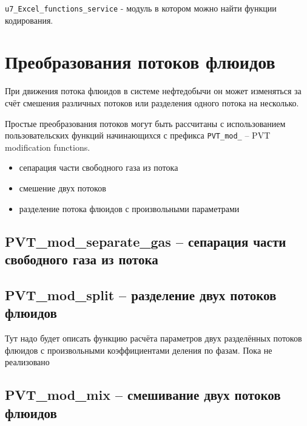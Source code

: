 

\texttt{u7_Excel_functions_service} - модуль в котором можно найти функции кодирования. 

\section{Преобразования потоков флюидов}
При движения потока флюидов в системе нефтедобычи он может изменяться за счёт смешения различных потоков или разделения одного потока на несколько.

Простые преобразования потоков могут быть рассчитаны с использованием пользовательских функций \unf{} начинающихся с префикса \texttt{PVT_mod_} -- PVT modification functions.
\begin{itemize}
	\item сепарация части свободного газа из потока
	\item смешение двух потоков
	\item разделение потока флюидов с произвольными параметрами
\end{itemize}

\subsection{PVT\_mod\_separate\_gas -- сепарация части свободного газа из потока}

 

\subsection{PVT\_mod\_split -- разделение двух потоков флюидов}

Тут надо будет описать функцию расчёта параметров двух разделённых потоков флюидов с произвольными коэффициентами деления по фазам. Пока не реализовано

\subsection{PVT\_mod\_mix -- смешивание двух потоков флюидов}

